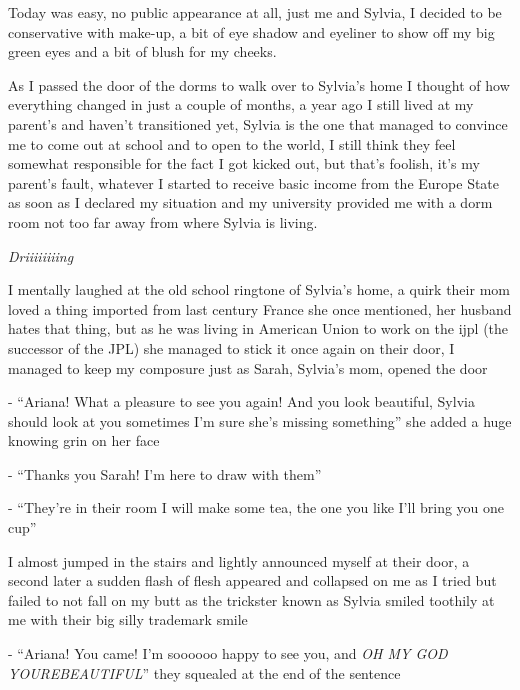 \documentclass[hidelinks,12pt,a4paper]{book}
\begin{document}
Today was easy, no public appearance at all, just me and Sylvia, I decided to be conservative with make-up, 
a bit of eye shadow and eyeliner to show off my big green eyes and a bit of blush for my cheeks.\par
\bigskip

As I passed the door of the dorms to walk over to Sylvia's home 
I thought of how everything changed in just a couple of months, a year ago I still lived at my parent's 
and haven't transitioned yet, Sylvia is the one that managed to convince me to come out at school and to open to the world, 
I still think they feel somewhat responsible for the fact I got kicked out, but that's foolish, it's my parent's fault, 
whatever I started to receive basic income from the Europe State as soon as I declared my situation and my 
university provided me with a dorm room not too far away from where Sylvia is living.\par
\bigskip

\textit{Driiiiiiiing}\par
I mentally laughed at the old school ringtone of Sylvia's home, 
a quirk their mom loved a thing imported from last century France she once mentioned, 
her husband hates that thing, but as he was living in American Union to work on the 
\gls{ijpl} (the successor of the JPL) she managed to stick it once again on their door, 
I managed to keep my composure just as Sarah, Sylvia's mom, opened the door\par
\bigskip

- “Ariana! What a pleasure to see you again! And you look beautiful, 
Sylvia should look at you sometimes I'm sure she's missing something” she added a huge knowing grin on her face\par
- “Thanks you Sarah! I'm here to draw with them”\par 
- “They're in their room I will make some tea, the one you like I'll bring you one cup”\par
\bigskip

I almost jumped in the stairs and lightly announced myself at their door, 
a second later a sudden flash of flesh appeared and collapsed on me as 
I tried but failed to not fall on my butt as the trickster known as Sylvia smiled 
toothily at me with their big silly trademark smile\newline

- “Ariana! You came! I'm soooooo happy to see you, and \textit{OH MY GOD YOUREBEAUTIFUL}” they squealed at the end of the sentence\par
\bigskip
\end{document}
